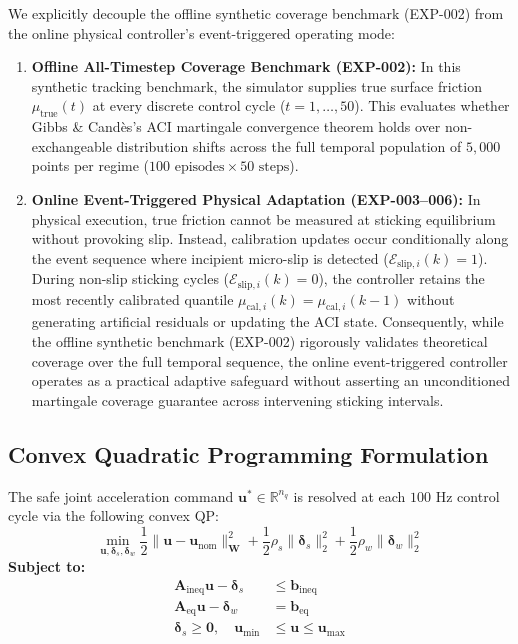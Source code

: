 \begin{remark}
We explicitly decouple the offline synthetic coverage benchmark (EXP-002) from the online physical controller's event-triggered operating mode:
\begin{enumerate}
    \item \textbf{Offline All-Timestep Coverage Benchmark (EXP-002):} In this synthetic tracking benchmark, the simulator supplies true surface friction $\mu_{\text{true}}(t)$ at every discrete control cycle ($t = 1, \dots, 50$). This evaluates whether Gibbs \& Candès's ACI martingale convergence theorem holds over non-exchangeable distribution shifts across the full temporal population of $5,000$ points per regime ($100\text{ episodes} \times 50\text{ steps}$).
    \item \textbf{Online Event-Triggered Physical Adaptation (EXP-003--006):} In physical execution, true friction cannot be measured at sticking equilibrium without provoking slip. Instead, calibration updates occur conditionally along the event sequence where incipient micro-slip is detected ($\mathcal{E}_{\text{slip}, i}(k) = 1$). During non-slip sticking cycles ($\mathcal{E}_{\text{slip}, i}(k) = 0$), the controller retains the most recently calibrated quantile $\mu_{\text{cal}, i}(k) = \mu_{\text{cal}, i}(k-1)$ without generating artificial residuals or updating the ACI state. Consequently, while the offline synthetic benchmark (EXP-002) rigorously validates theoretical coverage over the full temporal sequence, the online event-triggered controller operates as a practical adaptive safeguard without asserting an unconditioned martingale coverage guarantee across intervening sticking intervals.
\end{enumerate}
\end{remark}

\subsection{Convex Quadratic Programming Formulation}
The safe joint acceleration command $\mathbf{u}^* \in \mathbb{R}^{n_q}$ is resolved at each $100\text{ Hz}$ control cycle via the following convex QP:
\begin{equation}
    \min_{\mathbf{u}, \boldsymbol{\delta}_s, \boldsymbol{\delta}_w} \frac{1}{2} \|\mathbf{u} - \mathbf{u}_{\text{nom}}\|_{\mathbf{W}}^2 + \frac{1}{2} \rho_s \|\boldsymbol{\delta}_s\|_2^2 + \frac{1}{2} \rho_w \|\boldsymbol{\delta}_w\|_2^2
    \label{eq:full_qp_filter}
\end{equation}
\textbf{Subject to:}
\begin{align}
    \mathbf{A}_{\text{ineq}} \mathbf{u} - \boldsymbol{\delta}_s &\le \mathbf{b}_{\text{ineq}} \label{eq:qp_ineq_sys} \\
    \mathbf{A}_{\text{eq}} \mathbf{u} - \boldsymbol{\delta}_w &= \mathbf{b}_{\text{eq}} \label{eq:qp_eq_sys} \\
    \boldsymbol{\delta}_s \ge \mathbf{0}, \quad \mathbf{u}_{\min} &\le \mathbf{u} \le \mathbf{u}_{\max} \label{eq:qp_bounds_sys}
\end{align}

